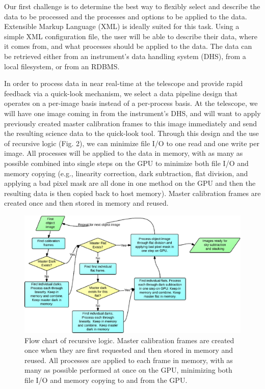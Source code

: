Our first challenge is to determine the best way to flexibly select and
describe the data to be processed and the processes and options to be
applied to the data.  Extensible Markup Language (XML) is ideally suited for
this task.  Using a simple XML configuration file, the user will be able to
describe their data, where it comes from, and what processes should be applied
to the data.  The data can be retrieved either from an instrument's data
handling system (DHS), from a local filesystem, or from an RDBMS.
 
In order to process data in near real-time at the telescope and provide
rapid feedback via a quick-look mechanism, we select a data pipeline design
that operates on a per-image basis instead of a per-process basis.  At the
telescope, we will have one image coming in from the instrument's DHS, 
and will want to apply previously created master calibration frames to this
image immediately and send the resulting science data to the quick-look tool.
Through this design and the use of recursive logic (Fig. 2), we can minimize
file I/O to one read and one write per image.  All processes will be
applied to the data in memory, with as many as possible combined into
single steps on the GPU to minimize both file I/O and memory copying
(e.g., linearity correction, dark subtraction, flat division, and applying
a bad pixel mask are all done in one method on the GPU and then the resulting
data is then copied back to host memory).  Master calibration frames are
created once and then stored in memory and reused.

\begin{figure}[!ht]
\includegraphics{part4/Warner_O31/O31_f2.eps}

\caption{Flow chart of recursive logic.  Master calibration frames are created
once when they are first requested and then stored in memory and reused.
All processes are applied to each frame in memory, with as many as possible
performed at once on the GPU, minimizing both file I/O and memory copying to and
from the GPU. }

\end{figure}


